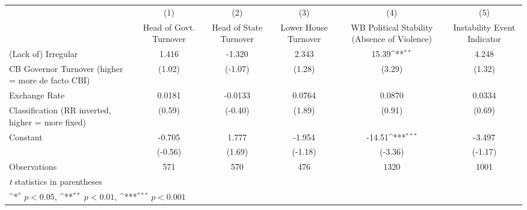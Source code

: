 {
\def\sym#1{\ifmmode^{#1}\else\(^{#1}\)\fi}
\begin{tabular}{l*{5}{c}}
\hline\hline
                    &\multicolumn{1}{c}{(1)}&\multicolumn{1}{c}{(2)}&\multicolumn{1}{c}{(3)}&\multicolumn{1}{c}{(4)}&\multicolumn{1}{c}{(5)}\\
                    &\multicolumn{1}{c}{Head of Govt. Turnover}&\multicolumn{1}{c}{Head of State Turnover}&\multicolumn{1}{c}{Lower House Turnover}&\multicolumn{1}{c}{WB Political Stability (Absence of Violence)}&\multicolumn{1}{c}{Instability Event Indicator}\\
\hline
(Lack of) Irregular &       1.416         &      -1.320         &       2.343         &       15.39\sym{**} &       4.248         \\
CB Governor Turnover (higher = more de facto CBI)&      (1.02)         &     (-1.07)         &      (1.28)         &      (3.29)         &      (1.32)         \\
[1em]
Exchange Rate       &      0.0181         &     -0.0133         &      0.0764         &      0.0870         &      0.0334         \\
Classification (RR inverted, higher = more fixed)&      (0.59)         &     (-0.40)         &      (1.89)         &      (0.91)         &      (0.69)         \\
[1em]
Constant            &      -0.705         &       1.777         &      -1.954         &      -14.51\sym{***}&      -3.497         \\
                    &     (-0.56)         &      (1.69)         &     (-1.18)         &     (-3.36)         &     (-1.17)         \\
\hline
Observations        &         571         &         570         &         476         &        1320         &        1001         \\
\hline\hline
\multicolumn{6}{l}{\footnotesize \textit{t} statistics in parentheses}\\
\multicolumn{6}{l}{\footnotesize \sym{*} \(p<0.05\), \sym{**} \(p<0.01\), \sym{***} \(p<0.001\)}\\
\end{tabular}
}

